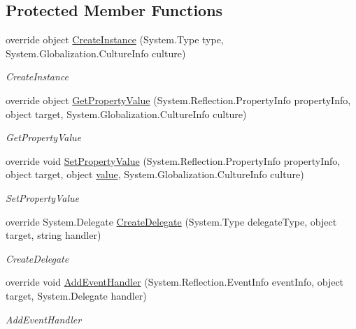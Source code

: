 \subsection*{Protected Member Functions}
\begin{DoxyCompactItemize}
\item 
override object \hyperlink{class_xaml_generated_namespace_1_1_generated_internal_type_helper_aefb7a98fceb9c287cef4756942f441d1}{Create\+Instance} (System.\+Type type, System.\+Globalization.\+Culture\+Info culture)
\begin{DoxyCompactList}\small\item\em Create\+Instance \end{DoxyCompactList}\item 
override object \hyperlink{class_xaml_generated_namespace_1_1_generated_internal_type_helper_afdc9fe15b56607d02082908d934480c6}{Get\+Property\+Value} (System.\+Reflection.\+Property\+Info property\+Info, object target, System.\+Globalization.\+Culture\+Info culture)
\begin{DoxyCompactList}\small\item\em Get\+Property\+Value \end{DoxyCompactList}\item 
override void \hyperlink{class_xaml_generated_namespace_1_1_generated_internal_type_helper_ade0f04c0f7b18dd5b170e071d5534d38}{Set\+Property\+Value} (System.\+Reflection.\+Property\+Info property\+Info, object target, object \hyperlink{_annotations_8cs_aa47dc10177d95db720062975cdba1f3a}{value}, System.\+Globalization.\+Culture\+Info culture)
\begin{DoxyCompactList}\small\item\em Set\+Property\+Value \end{DoxyCompactList}\item 
override System.\+Delegate \hyperlink{class_xaml_generated_namespace_1_1_generated_internal_type_helper_a8ec4c37e82d9f4e867e9655f4eac3a78}{Create\+Delegate} (System.\+Type delegate\+Type, object target, string handler)
\begin{DoxyCompactList}\small\item\em Create\+Delegate \end{DoxyCompactList}\item 
override void \hyperlink{class_xaml_generated_namespace_1_1_generated_internal_type_helper_a73471f4a6d1ca4c4fceec9ad8610f0c8}{Add\+Event\+Handler} (System.\+Reflection.\+Event\+Info event\+Info, object target, System.\+Delegate handler)
\begin{DoxyCompactList}\small\item\em Add\+Event\+Handler \end{DoxyCompactList}\end{DoxyCompactItemize}


